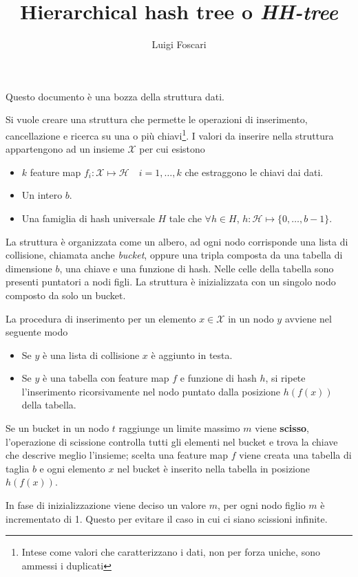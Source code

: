 \documentclass[a4paper]{article}
\title{Hierarchical hash tree o \textit{HH-tree}}
\author{Luigi Foscari}
\date{}
\begin{document}
\maketitle

Questo documento è una bozza della struttura dati.

Si vuole creare una struttura che permette le operazioni di inserimento, cancellazione e ricerca su una o più chiavi\footnote{Intese come valori che caratterizzano i dati, non per forza uniche, sono ammessi i duplicati}. I valori da inserire nella struttura appartengono ad un insieme $\mathcal{X}$ per cui esistono
\begin{itemize}
	\item $k$ feature map $f_i: \mathcal{X} \mapsto \mathcal{H} \quad i=1,\ldots,k$ che estraggono le chiavi dai dati.
	\item Un intero $b$.
	\item Una famiglia di hash universale $H$ tale che $\forall h \in H$, $h: \mathcal{H} \mapsto \{ 0, \ldots, b - 1 \}$.
\end{itemize}

La struttura è organizzata come un albero, ad ogni nodo corrisponde una lista di collisione, chiamata anche \textit{bucket}, oppure una tripla composta da una tabella di dimensione $b$, una chiave e una funzione di hash. Nelle celle della tabella sono presenti puntatori a nodi figli. La struttura è inizializzata con un singolo nodo composto da solo un bucket.

La procedura di inserimento per un elemento $x \in \mathcal{X}$ in un nodo $y$ avviene nel seguente modo
\begin{itemize}
	\item Se $y$ è una lista di collisione $x$ è aggiunto in testa.
	\item Se $y$ è una tabella con feature map $f$ e funzione di hash $h$, si ripete l'inserimento ricorsivamente nel nodo puntato dalla posizione $h(f(x))$ della tabella.
\end{itemize}

Se un bucket in un nodo $t$ raggiunge un limite massimo $m$ viene \textbf{scisso}, l'operazione di scissione controlla tutti gli elementi nel bucket e trova la chiave che descrive meglio l'insieme; scelta una feature map $f$ viene creata una tabella di taglia $b$ e ogni elemento $x$ nel bucket è inserito nella tabella in posizione $h(f(x))$.

In fase di inizializzazione viene deciso un valore $m$, per ogni nodo figlio $m$ è incrementato di 1. Questo per evitare il caso in cui ci siano scissioni infinite.
\end{document}
